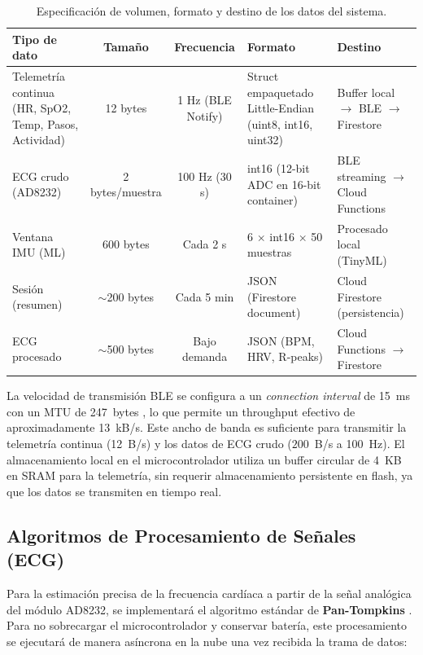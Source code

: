 \documentclass[letterpaper,11pt]{article}
\begin{document}
\begin{table}[H]
    \centering
    \renewcommand{\arraystretch}{1.3}
    \begin{tabular}{|L{3cm}|c|c|L{3cm}|L{3.5cm}|}
        \hline
        \textbf{Tipo de dato}    & \textbf{Tamaño} & \textbf{Frecuencia}  & \textbf{Formato}                          & \textbf{Destino}                               \\ \hline
        Telemetría continua (HR, SpO2, Temp, Pasos, Actividad) & 12 bytes        & 1 Hz (BLE Notify) & Struct empaquetado Little-Endian (uint8, int16, uint32) & Buffer local $\rightarrow$ BLE $\rightarrow$ Firestore \\ \hline
        ECG crudo (AD8232)       & 2 bytes/muestra & 100 Hz (30 s)      & int16 (12-bit ADC en 16-bit container) \citep{ad8232_ds}    & BLE streaming $\rightarrow$ Cloud Functions    \\ \hline
        Ventana IMU (ML)         & 600 bytes       & Cada 2 s           & 6 $\times$ int16 $\times$ 50 muestras \citep{bmi160_ds}     & Procesado local (TinyML)                       \\ \hline
        Sesión (resumen)         & $\sim$200 bytes & Cada 5 min         & JSON (Firestore document)                 & Cloud Firestore (persistencia) \citep{firebase_docs}                 \\ \hline
        ECG procesado            & $\sim$500 bytes & Bajo demanda       & JSON (BPM, HRV, R-peaks)                  & Cloud Functions $\rightarrow$ Firestore        \\ \hline
    \end{tabular}
    \caption{Especificación de volumen, formato y destino de los datos del sistema.}
    \label{tab:datos}
\end{table}

La velocidad de transmisión BLE se configura a un \textit{connection interval} de 15~ms con un MTU de 247~bytes \citep{ble_core_spec}, lo que permite un throughput efectivo de aproximadamente 13~kB/s. Este ancho de banda es suficiente para transmitir la telemetría continua (12~B/s) y los datos de ECG crudo ($200$~B/s a 100~Hz). El almacenamiento local en el microcontrolador utiliza un buffer circular de 4~KB en SRAM \citep{esp32c3_ds} para la telemetría, sin requerir almacenamiento persistente en flash, ya que los datos se transmiten en tiempo real.

\subsection{Algoritmos de Procesamiento de Señales (ECG)}
Para la estimación precisa de la frecuencia cardíaca a partir de la señal analógica del módulo AD8232, se implementará el algoritmo estándar de \textbf{Pan-Tompkins} \citep{pan_tompkins}. Para no sobrecargar el microcontrolador y conservar batería, este procesamiento se ejecutará de manera asíncrona en la nube una vez recibida la trama de datos:
\end{document}
